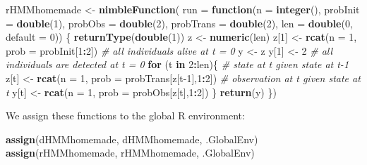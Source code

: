 \documentclass[
  12pt,
]{krantz}
\newenvironment{Shaded}{\begin{snugshade}}{\end{snugshade}}
\newcommand{\AttributeTok}[1]{\textcolor[rgb]{0.13,0.29,0.53}{#1}}
\newcommand{\CommentTok}[1]{\textcolor[rgb]{0.56,0.35,0.01}{\textit{#1}}}
\newcommand{\ControlFlowTok}[1]{\textcolor[rgb]{0.13,0.29,0.53}{\textbf{#1}}}
\newcommand{\DecValTok}[1]{\textcolor[rgb]{0.00,0.00,0.81}{#1}}
\newcommand{\FunctionTok}[1]{\textcolor[rgb]{0.13,0.29,0.53}{\textbf{#1}}}
\newcommand{\NormalTok}[1]{#1}
\newcommand{\OtherTok}[1]{\textcolor[rgb]{0.56,0.35,0.01}{#1}}
\newcommand{\SpecialCharTok}[1]{\textcolor[rgb]{0.81,0.36,0.00}{\textbf{#1}}}
\newcommand{\StringTok}[1]{\textcolor[rgb]{0.31,0.60,0.02}{#1}}
\begin{document}
\begin{Shaded}
\begin{Highlighting}[]
\NormalTok{rHMMhomemade }\OtherTok{\textless{}{-}} \FunctionTok{nimbleFunction}\NormalTok{(}
  \AttributeTok{run =} \ControlFlowTok{function}\NormalTok{(}\AttributeTok{n =} \FunctionTok{integer}\NormalTok{(),}
                 \AttributeTok{probInit =} \FunctionTok{double}\NormalTok{(}\DecValTok{1}\NormalTok{),}
                 \AttributeTok{probObs =} \FunctionTok{double}\NormalTok{(}\DecValTok{2}\NormalTok{),}
                 \AttributeTok{probTrans =} \FunctionTok{double}\NormalTok{(}\DecValTok{2}\NormalTok{),}
                 \AttributeTok{len =} \FunctionTok{double}\NormalTok{(}\DecValTok{0}\NormalTok{, }\AttributeTok{default =} \DecValTok{0}\NormalTok{)) \{}
    \FunctionTok{returnType}\NormalTok{(}\FunctionTok{double}\NormalTok{(}\DecValTok{1}\NormalTok{))}
\NormalTok{    z }\OtherTok{\textless{}{-}} \FunctionTok{numeric}\NormalTok{(len)}
\NormalTok{    z[}\DecValTok{1}\NormalTok{] }\OtherTok{\textless{}{-}} \FunctionTok{rcat}\NormalTok{(}\AttributeTok{n =} \DecValTok{1}\NormalTok{, }\AttributeTok{prob =}\NormalTok{ probInit[}\DecValTok{1}\SpecialCharTok{:}\DecValTok{2}\NormalTok{]) }\CommentTok{\# all individuals alive at t = 0}
\NormalTok{    y }\OtherTok{\textless{}{-}}\NormalTok{ z}
\NormalTok{    y[}\DecValTok{1}\NormalTok{] }\OtherTok{\textless{}{-}} \DecValTok{2} \CommentTok{\# all individuals are detected at t = 0}
    \ControlFlowTok{for}\NormalTok{ (t }\ControlFlowTok{in} \DecValTok{2}\SpecialCharTok{:}\NormalTok{len)\{}
      \CommentTok{\# state at t given state at t{-}1}
\NormalTok{      z[t] }\OtherTok{\textless{}{-}} \FunctionTok{rcat}\NormalTok{(}\AttributeTok{n =} \DecValTok{1}\NormalTok{, }\AttributeTok{prob =}\NormalTok{ probTrans[z[t}\DecValTok{{-}1}\NormalTok{],}\DecValTok{1}\SpecialCharTok{:}\DecValTok{2}\NormalTok{]) }
      \CommentTok{\# observation at t given state at t}
\NormalTok{      y[t] }\OtherTok{\textless{}{-}} \FunctionTok{rcat}\NormalTok{(}\AttributeTok{n =} \DecValTok{1}\NormalTok{, }\AttributeTok{prob =}\NormalTok{ probObs[z[t],}\DecValTok{1}\SpecialCharTok{:}\DecValTok{2}\NormalTok{]) }
\NormalTok{    \}}
    \FunctionTok{return}\NormalTok{(y)}
\NormalTok{  \})}
\end{Highlighting}
\end{Shaded}

We assign these functions to the global R environment:

\begin{Shaded}
\begin{Highlighting}[]
\FunctionTok{assign}\NormalTok{(}\StringTok{\textquotesingle{}dHMMhomemade\textquotesingle{}}\NormalTok{, dHMMhomemade, .GlobalEnv)}
\FunctionTok{assign}\NormalTok{(}\StringTok{\textquotesingle{}rHMMhomemade\textquotesingle{}}\NormalTok{, rHMMhomemade, .GlobalEnv)}
\end{Highlighting}
\end{Shaded}
\end{document}
